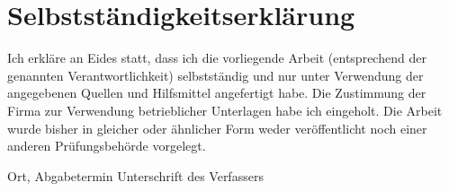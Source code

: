 \documentclass[
	12pt, 
	a4paper, 
	listof=entryprefix,
	captions=tableheading
	]{scrartcl}
\begin{document}
\section*{Selbstständigkeitserklärung}
Ich erkläre an Eides statt, dass ich die vorliegende Arbeit (entsprechend der genannten Verantwortlichkeit) selbstständig und nur unter Verwendung der angegebenen Quellen und
Hilfsmittel angefertigt habe.
Die Zustimmung der Firma zur Verwendung betrieblicher Unterlagen habe ich eingeholt.
Die Arbeit wurde bisher in gleicher oder ähnlicher Form weder veröffentlicht noch einer anderen
Prüfungsbehörde vorgelegt.
\newline
\newline
\newline
\newline

\begin{flushleft}

Ort, Abgabetermin \hfill Unterschrift des Verfassers
\end{flushleft}
\end{document}
